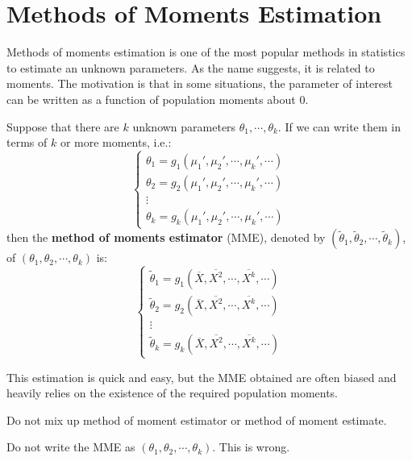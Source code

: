 \documentclass{huhtakm-template-book-v2}
\begin{document}
\section{Methods of Moments Estimation}
Methods of moments estimation is one of the most popular methods in statistics to estimate an unknown parameters. As the name suggests, it is related to moments. The motivation is that in some situations, the parameter of interest can be written as a function of population moments about $0$.
\begin{defn}
	Suppose that there are $k$ unknown parameters $\theta_{1},\cdots,\theta_{k}$. If we can write them in terms of $k$ or more moments, i.e.:
	\begin{equation*}
		\begin{cases}
			\theta_{1}=g_{1}(\mu_{1}',\mu_{2}',\cdots,\mu_{k}',\cdots)\\
			\theta_{2}=g_{2}(\mu_{1}',\mu_{2}',\cdots,\mu_{k}',\cdots)\\
			\vdots\\
			\theta_{k}=g_{k}(\mu_{1}',\mu_{2}',\cdots,\mu_{k}',\cdots)
		\end{cases}
	\end{equation*}
	then the \textbf{method of moments estimator} (MME), denoted by $(\widetilde{\theta}_{1},\widetilde{\theta}_{2},\cdots,\widetilde{\theta}_{k})$, of $(\theta_{1},\theta_{2},\cdots,\theta_{k})$ is:
	\begin{equation*}
		\begin{cases}
			\widetilde{\theta}_{1}=g_{1}(\overline{X},\overline{X^{2}},\cdots,\overline{X^{k}},\cdots)\\
			\widetilde{\theta}_{2}=g_{2}(\overline{X},\overline{X^{2}},\cdots,\overline{X^{k}},\cdots)\\
			\vdots\\
			\widetilde{\theta}_{k}=g_{k}(\overline{X},\overline{X^{2}},\cdots,\overline{X^{k}},\cdots)
		\end{cases}
	\end{equation*}
\end{defn}
\begin{rem}
	This estimation is quick and easy, but the MME obtained are often biased and heavily relies on the existence of the required population moments.
\end{rem}
\begin{rem}
	Do not mix up method of moment estimator or method of moment estimate.
\end{rem}
\begin{rem}
	Do not write the MME as $(\theta_{1},\theta_{2},\cdots,\theta_{k})$. This is wrong.
\end{rem}
\end{document}

